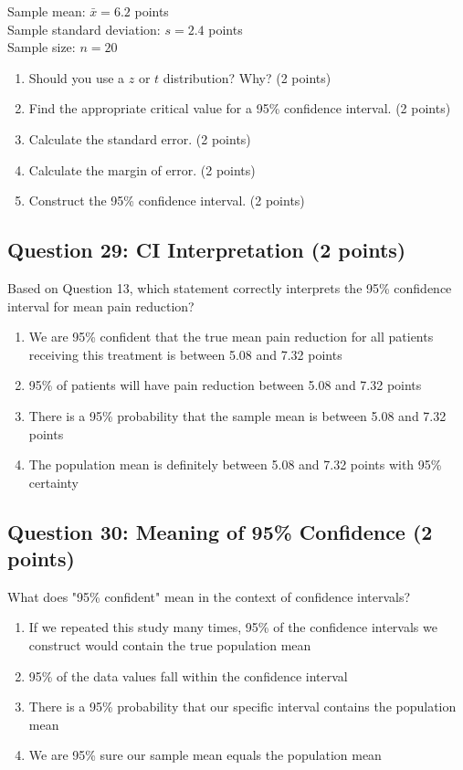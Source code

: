 \documentclass[11pt]{article}
\begin{document}
Sample mean: $\bar{x} = 6.2$ points\\
Sample standard deviation: $s = 2.4$ points\\
Sample size: $n = 20$

\begin{enumerate}[label=\alph*)]
\item Should you use a $z$ or $t$ distribution? Why? (2 points)
\item Find the appropriate critical value for a 95\% confidence interval. (2 points)
\item Calculate the standard error. (2 points)
\item Calculate the margin of error. (2 points)
\item Construct the 95\% confidence interval. (2 points)
\end{enumerate}

\vspace{1.5cm}

\subsection*{Question 29: CI Interpretation (2 points)}

Based on Question 13, which statement correctly interprets the 95\% confidence interval for mean pain reduction?

\begin{enumerate}[label=\Alph*)]
\item We are 95\% confident that the true mean pain reduction for all patients receiving this treatment is between 5.08 and 7.32 points
\item 95\% of patients will have pain reduction between 5.08 and 7.32 points
\item There is a 95\% probability that the sample mean is between 5.08 and 7.32 points
\item The population mean is definitely between 5.08 and 7.32 points with 95\% certainty
\end{enumerate}

\vspace{0.5cm}

\subsection*{Question 30: Meaning of 95\% Confidence (2 points)}

What does "95\% confident" mean in the context of confidence intervals?

\begin{enumerate}[label=\Alph*)]
\item If we repeated this study many times, 95\% of the confidence intervals we construct would contain the true population mean
\item 95\% of the data values fall within the confidence interval
\item There is a 95\% probability that our specific interval contains the population mean
\item We are 95\% sure our sample mean equals the population mean
\end{enumerate}
\end{document}
